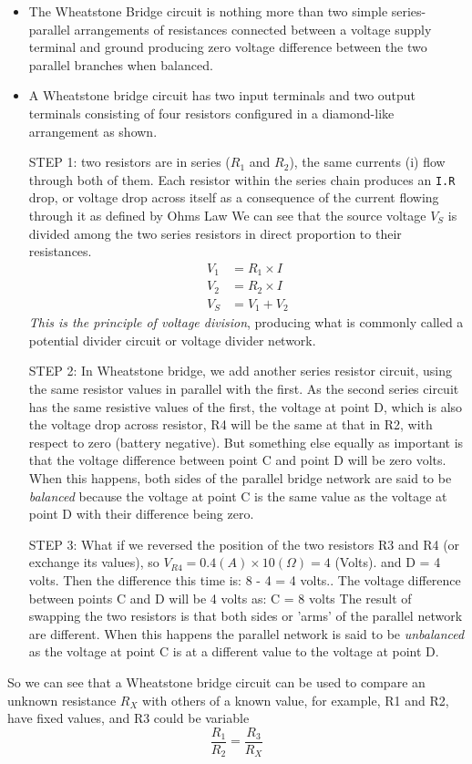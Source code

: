 \begin{itemize}
  \item  The Wheatstone Bridge circuit is nothing more than two simple
  series-parallel arrangements of resistances connected between a voltage supply
  terminal and ground producing zero voltage difference between the two parallel
  branches when balanced.
  
  \item  A Wheatstone bridge circuit has two input terminals and two output
  terminals consisting of four resistors configured in a diamond-like
  arrangement as shown.  

STEP 1: two resistors are in series ($R_1$ and $R_2$), the same currents (i)
flow through both of them. Each resistor within the series chain produces an
\verb!I.R! drop, or voltage drop across itself as a consequence of the current
flowing through it as defined by Ohms Law We can see that the source voltage
$V_S$ is divided among the two series resistors in direct proportion to their
resistances.
\begin{equation}
\begin{split}
V_1 &= R_1 \times I \\
V_2 &= R_2 \times I \\
V_S &= V_1 + V_2
\end{split}
\end{equation}
{\it This is the principle of voltage division}, producing what is commonly
called a potential divider circuit or voltage divider network.

STEP 2: In Wheatstone bridge, we add another series resistor circuit,  using the
same resistor values in parallel with the first. As the second series circuit
has the same resistive values of the first, the voltage at point D, which is
also the voltage drop across resistor, R4 will be the same at that in R2, with
respect to zero (battery negative).
But something else equally as important is that the voltage difference between
point C and point D will be zero volts. When this happens, both sides of the
parallel bridge network are said to be {\it balanced} because the voltage at
point C is the same value as the voltage at point D with their difference being
zero.

STEP 3: What if we reversed the position of the two resistors R3 and R4 (or
exchange its values), so $V_{R4}= 0.4 (A) \times 10 (\Omega) = 4$ (Volts).
and D = 4 volts. Then the difference this time is: 8 - 4 = 4 volts..
The voltage difference between points C and D will be 4 volts as: C = 8 volts
The result of swapping the two resistors is that both sides or 'arms' of the
parallel network are different. When
this happens the parallel network is said to be {\it unbalanced} as the voltage
at point C is at a different value to the voltage at point D.  
\end{itemize}
So we can see that a Wheatstone bridge circuit can be used to compare an unknown
resistance $R_X$ with others of a known value, for example, R1 and R2, have
fixed values, and R3 could be variable 
\begin{equation}
\frac{R_1}{R_2} = \frac{R_3}{R_X} 
\end{equation}

